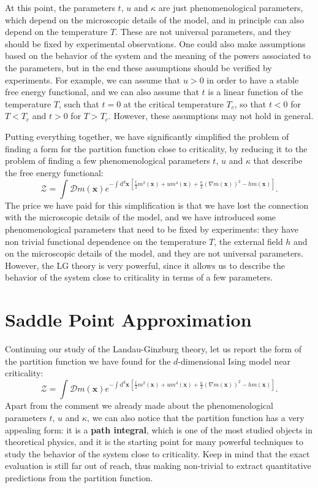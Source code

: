 At this point, the parameters \(t\), \(u\) and \(\kappa\) are just phenomenological parameters, which depend on the microscopic details of the model, and in principle can also depend on the temperature \(T\). These are not universal parameters, and they should be fixed by experimental observations. One could also make assumptions based on the behavior of the system and the meaning of the powers associated to the parameters, but in the end these assumptions should be verified by experiments. For example, we can assume that \(u > 0\) in order to have a stable free energy functional, and we can also assume that \(t\) is a linear function of the temperature \(T\), such that \(t = 0\) at the critical temperature \(T_c\), so that \(t < 0\) for \(T < T_c\) and \(t > 0\) for \(T > T_c\). However, these assumptions may not hold in general.

Putting everything together, we have significantly simplified the problem of finding a form for the partition function close to criticality, by reducing it to the problem of finding a few phenomenological parameters \(t\), \(u\) and \(\kappa\) that describe the free energy functional:
\[
    \mathcal{Z} = \int \mathcal{D} m(\mathbf{x}) e^{-\int \mathrm{d}^d \mathbf{x}\, \left[ \frac{t}{2} m^2(\mathbf{x}) + u m^4(\mathbf{x}) + \frac{\kappa}{2} (\nabla m(\mathbf{x}))^2 - h m(\mathbf{x})\right]}.
\]
The price we have paid for this simplification is that we have lost the connection with the microscopic details of the model, and we have introduced some phenomenological parameters that need to be fixed by experiments: they have non trivial functional dependence on the temperature \(T\), the external field \(h\) and on the microscopic details of the model, and they are not universal parameters. However, the LG theory is very powerful, since it allows us to describe the behavior of the system close to criticality in terms of a few parameters.

\section{Saddle Point Approximation}

Continuing our study of the Landau-Ginzburg theory, let us report the form of the partition function we have found for the \(d\)-dimensional Ising model near criticality:
\[
    \mathcal{Z} = \int \mathcal{D} m(\mathbf{x}) e^{-\int \mathrm{d}^d \mathbf{x}\, \left[ \frac{t}{2} m^2(\mathbf{x}) + u m^4(\mathbf{x}) + \frac{\kappa}{2} (\nabla m(\mathbf{x}))^2 - h m(\mathbf{x})\right]}.
\]
Apart from the comment we already made about the phenomenological parameters \(t\), \(u\) and \(\kappa\), we can also notice that the partition function has a very appealing form: it is a \textbf{path integral}, which is one of the most studied objects in theoretical physics, and it is the starting point for many powerful techniques to study the behavior of the system close to criticality. Keep in mind that the exact evaluation is still far out of reach, thus making non-trivial to extract quantitative predictions from the partition function.

